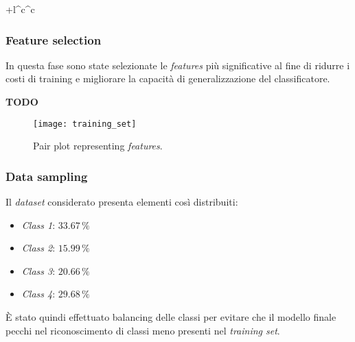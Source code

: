 \begin{center}
\begin{tabular}{+l^c^c}
                	\toprule\rowstyle{\bfseries}
                \end{tabular}
		        \end{center}
                
                \subsubsection{Feature selection}
                
                        In questa fase sono state selezionate le \textit{features} più significative al fine di ridurre i costi di training e migliorare la capacità di generalizzazione del classificatore.
                        
                        \textbf{TODO}
                        
                        \begin{figure}[!h]
                            \centering
                            \texttt{[image: training\_set]}
                            \caption{Pair plot representing \textit{features}.}
                            \label{fig:training_set_pairplot}
                        \end{figure}
                        \clearpage
                
                \subsubsection{Data sampling} 
                
                        Il \textit{dataset} considerato presenta elementi così distribuiti:
                        \begin{itemize}
                                \item \textit{Class 1}: $33.67 \, \%$
                                \item \textit{Class 2}: $15.99 \, \%$
                                \item \textit{Class 3}: $20.66 \, \%$
                                \item \textit{Class 4}: $29.68 \, \%$
                        \end{itemize}
                        
                        \`E stato quindi effettuato balancing delle classi per evitare che il modello finale pecchi nel riconoscimento di classi meno presenti nel \textit{training set}.
                        
